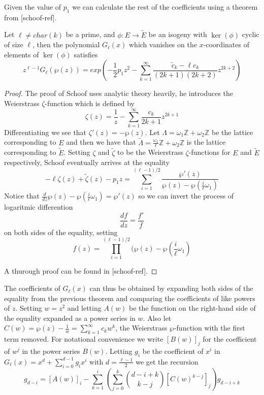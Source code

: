 Given the value of $p_1$ we can calculate the rest of the coefficients using a theorem from [schoof-ref].
\begin{thm}
 Let $\ell \neq char(k)$ be a prime, and $\phi: E \rightarrow \widetilde{E}$ be an isogeny with $\ker(\phi)$
cyclic of size $\ell$, then the polynomial $G_\ell(x)$ which vanishes on the $x$-coordinates of
elements of $\ker(\phi)$ satisfies
$$ z^{\ell-1}G_\ell(\wp(z)) = exp(-\frac{1}{2}p_1 z^2 - \sum_{k=1}^\infty \frac{\widetilde{c}_k-\ell c_k}{(2k+1)(2k+2)}z^{2k+2})$$
\end{thm}
\begin{proof}
 The proof of Schoof uses analytic theory heavily, he introduces the Weierstrass $\zeta$-function
which is defined by
$$\zeta(z) = \frac{1}{z} - \sum_{k=1}^\infty \frac{c_k}{2k+1} z^{2k+1} $$
Differentiating we see that $\zeta'(z) = - \wp(z)$. Let $\Lambda = \omega_1 \mathbb{Z}+\omega_2\mathbb{Z}$
be the lattice corresponding to $E$ and then we have that
$\widetilde{\Lambda} = \frac{\omega_1}{\ell}\mathbb{Z}+\omega_2\mathbb{Z}$ is the lattice corresponding
to $\widetilde{E}$. Setting $\zeta$ and $\widetilde{\zeta}$ to be the Weierstrass $\zeta$-functions for
$E$ and $\widetilde{E}$ respectively, Schoof eventually arrives at the equality
$$-\ell \zeta(z)+\widetilde{\zeta}(z)-p_1 z = \sum_{i=1}^{(\ell-1)/2} \frac{\wp'(z)}{\wp(z)-\wp(\frac{i}{\ell}\omega_1)} $$
Notice that $\frac{d}{dz} \wp(z) - \wp(\frac{i}{\ell}\omega_1) = \wp'(z)$ so we can invert the process
of logaritmic differention
$$ \frac{df}{dz} = \frac{f'}{f}$$
on both sides of the equality, setting $$f(z) = \prod_{i=1}^{(\ell-1)/2}(\wp(z)-\wp(\frac{i}{\ell}\omega_1)$$

A thurough proof can be found in [schoof-ref].
\end{proof}

The coefficients of $G_\ell(x)$ can thus be obtained by expanding both sides of
the equality from the previous theorem and comparing the coefficients of like powers of $z$.
Setting $w=z^2$ and letting $A(w)$ be the function on the right-hand side of the equality
expanded as a power series in $w$. Also let $C(w) = \wp(z) - \frac{1}{w} = \sum_{k=1}^\infty c_k w^k$,
the Weierstrass $\wp$-function with the first term removed. For notational convenience we
write $[B(w)]_j$ for the coefficient of $w^j$ in the power series $B(w)$. Letting $g_i$ be the
coefficient of $x^i$ in $G_\ell(x) = x^d + \sum_{i=0}^{d-1} g_i x^i$ with $d = \frac{\ell-1}{2}$ 
we get the recursion
$$g_{d-i} = [A(w)]_i - \sum_{k=1}^i \left( \sum_{j=0}^k \binom{d-i+k}{k-j} [C(w)^{k-j}]_j \right) g_{d-i+k} $$
